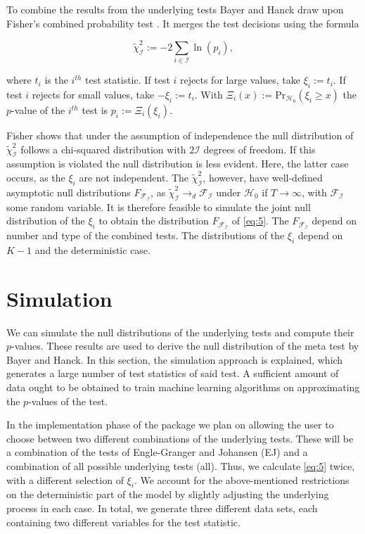 \documentclass[12pt,a4paper]{article}
\begin{document}
To combine the results from the underlying tests Bayer and Hanck draw
upon Fisher's combined probability test \autocite{Fisher_1932}. It
merges the test decisions using the formula

\begin{equation}
\tilde{\chi}^2_{\mathcal{I}} := -2 \sum_{i \in \mathcal{I}} \ln{(p_i)},
\label{eq:5}
\end{equation}

where \(t_i\) is the \(i^{th}\) test statistic. If test \(i\) rejects
for large values, take \(\xi_i := t_i\). If test \(i\) rejects for small
values, take \(-\xi_i := t_i\). With
\(\Xi_i(x) := \text{Pr}_{\mathcal{H_0}}(\xi_i \geq x)\) the \(p\)-value
of the \(i^{th}\) test is \(p_i := \Xi_i(\xi_i)\).

Fisher shows that under the assumption of independence the null
distribution of \(\tilde{\chi}^2_{\mathcal{I}}\) follows a chi-squared
distribution with \(2\mathcal{I}\) degrees of freedom. If this
assumption is violated the null distribution is less evident. Here, the
latter case occurs, as the \(\xi_i\) are not independent. The
\(\tilde{\chi}^2_{\mathcal{I}}\), however, have well-defined asymptotic
null distributions \(F_{\mathcal{F_I}}\), as
\(\tilde{\chi}^2_{\mathcal{I}} \rightarrow_d \mathcal{F_I}\) under
\(\mathcal{H}_0\) if \(T \rightarrow \infty\), with \(\mathcal{F_I}\)
some random variable. It is therefore feasible to simulate the joint
null distribution of the \(\xi_i\) to obtain the distribution
\(F_{\mathcal{F_I}}\) of \eqref{eq:5}. The \(F_{\mathcal{F_I}}\) depend
on number and type of the combined tests. The distributions of the
\(\xi_i\) depend on \(K-1\) and the deterministic case.

\hypertarget{simulation}{%
\section{Simulation}\label{simulation}}

We can simulate the null distributions of the underlying tests and
compute their \(p\)-values. These results are used to derive the null
distribution of the meta test by Bayer and Hanck. In this section, the
simulation approach is explained, which generates a large number of test
statistics of said test. A sufficient amount of data ought to be
obtained to train machine learning algorithms on approximating the
\(p\)-values of the test.

In the implementation phase of the package we plan on allowing the user
to choose between two different combinations of the underlying tests.
These will be a combination of the tests of Engle-Granger and Johansen
(EJ) and a combination of all possible underlying tests (all). Thus, we
calculate \eqref{eq:5} twice, with a different selection of \(\xi_i\).
We account for the above-mentioned restrictions on the deterministic
part of the model by slightly adjusting the underlying process in each
case. In total, we generate three different data sets, each containing
two different variables for the test statistic.
\end{document}
